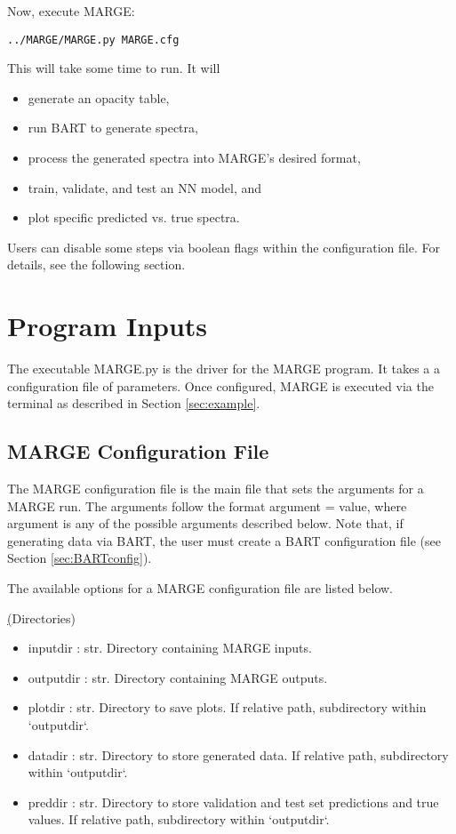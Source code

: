 \documentclass[letterpaper, 12pt]{article}
\begin{document}
\noindent Now, execute MARGE:
\begin{verbatim}
../MARGE/MARGE.py MARGE.cfg
\end{verbatim}

\noindent This will take some time to run.  It will 

\begin{itemize}
\item generate an opacity table,
\item run BART to generate spectra,
\item process the generated spectra into MARGE's desired format,
\item train, validate, and test an NN model, and
\item plot specific predicted vs. true spectra.
\end{itemize}

\noindent Users can disable some steps via boolean flags within the configuration file.  
For details, see the following section.


\section{Program Inputs}
\label{sec:inputs}

The executable MARGE.py is the driver for the MARGE program. It takes a 
a configuration file of parameters.  Once configured, MARGE is executed via 
the terminal as described in Section \ref{sec:example}.


\subsection{MARGE Configuration File}
\label{sec:config}
The MARGE configuration file is the main file that sets the arguments for a 
MARGE run. The arguments follow the format {\ttb argument = value}, where 
{\ttb argument} is any of the possible arguments described below. Note that, 
if generating data via BART, the user must create a BART configuration file 
(see Section \ref{sec:BARTconfig}).

\noindent The available options for a MARGE configuration file are listed below.

\noindent \underline(Directories)
\begin{itemize}
\item inputdir   : str.  Directory containing MARGE inputs.
\item outputdir  : str.  Directory containing MARGE outputs.
\item plotdir    : str.  Directory to save plots. 
                         If relative path, subdirectory within `outputdir`.
\item datadir    : str.  Directory to store generated data. 
                         If relative path, subdirectory within `outputdir`.
\item preddir    : str.  Directory to store validation and test set predictions and true values. 
                         If relative path, subdirectory within `outputdir`.
\end{itemize}
\end{document}
